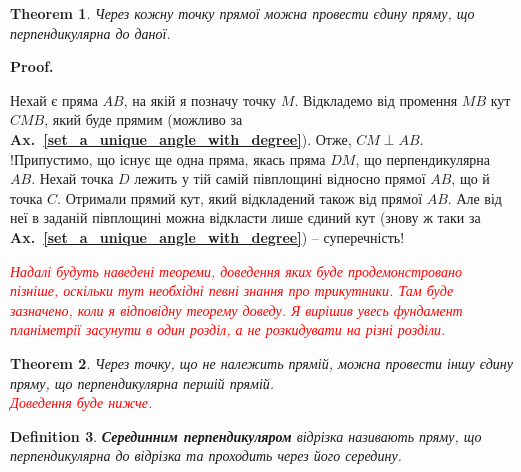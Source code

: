 \documentclass[a4paper, 10pt]{article}
\makeatletter
\theoremstyle{theoremdd}
\newtheorem{theorem}{Theorem}[subsection]
\theoremstyle{theoremdd}
\theoremstyle{theoremdd}
\newtheorem{definition}[theorem]{Definition}
\theoremstyle{theoremdd}
\theoremstyle{theoremdd}
\theoremstyle{theoremdd}
\theoremstyle{theoremdd}
\theoremstyle{theoremdd}
\theoremstyle{theoremdd}
\newcommand\axref[1]{\textbf{Ax.~\ref{#1}}}
\renewenvironment{proof}[1][Proof.\\]{\par
\pushQED{\hfill \qed}%
\normalfont \topsep6\p@\@plus6\p@\relax
\trivlist
\item\relax
{\bfseries
#1\@addpunct{.}}\hspace\labelsep\ignorespaces
}{%
\popQED\endtrivlist\@endpefalse
}
\makeatother
\begin{document}
\begin{theorem}
Через кожну точку прямої можна провести єдину пряму, що перпендикулярна до даної.
\end{theorem}

\begin{proof}
Нехай є пряма $AB$, на якій я позначу точку $M$. Відкладемо від промення $MB$ кут $CMB$, який буде прямим (можливо за \axref{set_a_unique_angle_with_degree}). Отже, $CM \perp AB$.\\
!Припустимо, що існує ще одна пряма, якась пряма $DM$, що перпендикулярна $AB$. Нехай точка $D$ лежить у тій самій півплощині відносно прямої $AB$, що й точка $C$. Отримали прямий кут, який відкладений також від прямої $AB$. Але від неї в заданій півплощині можна відкласти лише єдиний кут (знову ж таки за \axref{set_a_unique_angle_with_degree}) -- суперечність!
\end{proof}

\textcolor{red}{\textit{Надалі будуть наведені теореми, доведення яких буде продемонстровано пізніше, оскільки тут необхідні певні знання про трикутники. Там буде зазначено, коли я відповідну теорему доведу. Я вирішив увесь фундамент планіметрії засунути в один розділ, а не розкидувати на різні розділи.}}

\begin{theorem}
\label{line_point_not_in_line_draw_perpendicular}
Через точку, що не належить прямій, можна провести іншу єдину пряму, що перпендикулярна першій прямій.\\
\textcolor{red}{\textit{Доведення буде нижче.}}
\begin{figure}[H]
\centering
{}
\qquad
{}
\end{figure}
\end{theorem}

\begin{definition}
\textbf{Серединним перпендикуляром} відрізка називають пряму, що перпендикулярна до відрізка та проходить через його середину.
\begin{figure}[H]
\centering
{}
\end{figure}
\end{definition}
\end{document}
